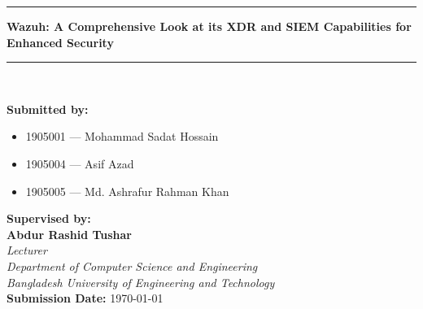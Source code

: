 \begin{titlepage}
\begin{centering}
       \noindent\rule[0.35ex]{\linewidth}{1pt} 
        \Large
        \textbf{Wazuh: A Comprehensive Look at its XDR and SIEM Capabilities for Enhanced Security}\\
        \noindent\rule[0.35ex]{\linewidth}{1pt}\\[0.75em]
    \end{centering}
    \noindent
\large
\textbf{Submitted by: }
         \begin{itemize}[leftmargin= 16pt, label={}, after=\vspace{1cm}]
             \item 1905001 --- Mohammad Sadat Hossain
             \item 1905004 --- Asif Azad
             \item 1905005 --- Md. Ashrafur Rahman Khan
        \end{itemize}
\vspace{-.5cm}
\textbf{Supervised by:}\\
\textbf{Abdur Rashid Tushar}\\
\textit{Lecturer}\\
\textit{Department of Computer Science and Engineering}\\
\textit{Bangladesh University of Engineering and Technology}\\[1em]
\textbf{Submission Date:} \today

\end{titlepage}
\restoregeometry%